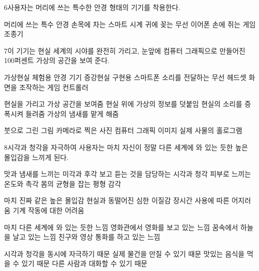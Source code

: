 \documentclass[fs85,seriesRus]{korfarm-base}
\begin{document}
\begin{kfSentenceUnit}{6}{사용자는 머리에 쓰는 특수한 안경 형태의 기기를 착용한다.}
\begin{kfChoices}
\kfChoice 머리에 쓰는 특수 안경
\kfChoice 손목에 차는 스마트 시계
\kfChoice 귀에 꽂는 무선 이어폰
\kfChoice 손에 쥐는 게임 조종기
\end{kfChoices}
\end{kfSentenceUnit}

\begin{kfSentenceUnit}{7}{이 기기는 현실 세계의 시야를 완전히 가리고, 눈앞에 컴퓨터 그래픽으로 만들어진 100퍼센트 가상의 공간을 보여 준다.}
\begin{kfChoices}
\kfChoice 가상현실 체험용 안경 기기
\kfChoice 증강현실 구현용 스마트폰
\kfChoice 소리를 전달하는 무선 헤드셋
\kfChoice 화면을 조작하는 게임 컨트롤러
\end{kfChoices}
\begin{kfChoices}
\kfChoice 현실을 가리고 가상 공간을 보여줌
\kfChoice 현실 위에 가상의 정보를 덧붙임
\kfChoice 현실의 소리를 증폭시켜 들려줌
\kfChoice 가상의 냄새를 맡게 해줌
\end{kfChoices}
\begin{kfChoices}
\kfChoice 붓으로 그린 그림
\kfChoice 카메라로 찍은 사진
\kfChoice 컴퓨터 그래픽 이미지
\kfChoice 실제 사물의 홀로그램
\end{kfChoices}
\end{kfSentenceUnit}

\begin{kfSentenceUnit}{8}{시각과 청각을 자극하여 사용자는 마치 자신이 정말 다른 세계에 와 있는 듯한 높은 몰입감을 느끼게 된다.}
\begin{kfChoices}
\kfChoice 맛과 냄새를 느끼는 미각과 후각
\kfChoice 보고 듣는 것을 담당하는 시각과 청각
\kfChoice 피부로 느끼는 온도와 촉각
\kfChoice 몸의 균형을 잡는 평형 감각
\end{kfChoices}
\begin{kfChoices}
\kfChoice 마치 진짜 같은 높은 몰입감
\kfChoice 현실과 동떨어진 심한 이질감
\kfChoice 장시간 사용에 따른 어지러움
\kfChoice 기계 작동에 대한 어려움
\end{kfChoices}
\begin{kfChoices}
\kfChoice 마치 다른 세계에 와 있는 듯한 느낌
\kfChoice 영화관에서 영화를 보고 있는 느낌
\kfChoice 꿈속에서 하늘을 날고 있는 느낌
\kfChoice 친구와 영상 통화를 하고 있는 느낌
\end{kfChoices}
\begin{kfChoices}
\kfChoice 시각과 청각을 동시에 자극하기 때문
\kfChoice 실제 물건을 만질 수 있기 때문
\kfChoice 맛있는 음식을 먹을 수 있기 때문
\kfChoice 다른 사람과 대화할 수 있기 때문
\end{kfChoices}
\end{kfSentenceUnit}
\end{document}

